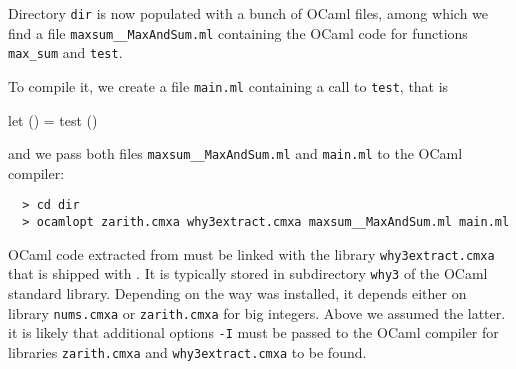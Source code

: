 Directory \texttt{dir} is now populated with a bunch of OCaml files,
among which we find a file \texttt{maxsum\_\_MaxAndSum.ml} containing
the OCaml code for functions \texttt{max\_sum} and \texttt{test}.

To compile it, we create a file \texttt{main.ml}
containing a call to \texttt{test}, that is
\begin{whycode}
  let () = test ()
\end{whycode}
and we pass both files \texttt{maxsum\_\_MaxAndSum.ml} and
\texttt{main.ml} to the OCaml compiler:
\begin{verbatim}
  > cd dir
  > ocamlopt zarith.cmxa why3extract.cmxa maxsum__MaxAndSum.ml main.ml
\end{verbatim}
OCaml code extracted from \why must be linked with the library
\texttt{why3extract.cmxa} that is shipped with \why. It is typically
stored in subdirectory \texttt{why3} of the OCaml standard library.
Depending on the way \why was installed, it depends either on library
\texttt{nums.cmxa} or \texttt{zarith.cmxa} for big integers. Above we
assumed the latter. it is likely that additional options \texttt{-I}
must be passed to the OCaml compiler for libraries
\texttt{zarith.cmxa} and \texttt{why3extract.cmxa} to be found.


